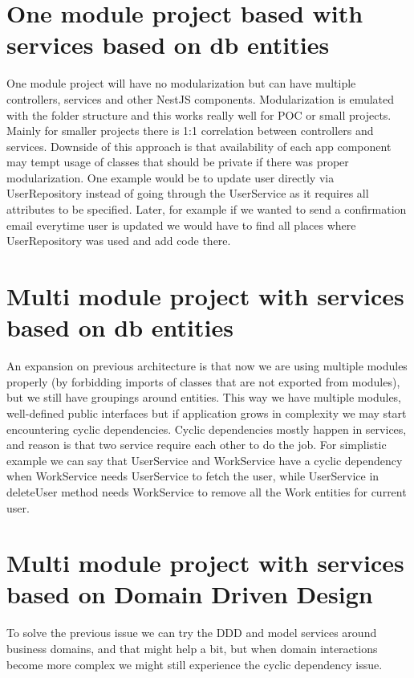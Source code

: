 \section{One module project based with services based on db entities}\label{sec:arch-om-db}

One module project will have no modularization but can have multiple controllers, services and other NestJS components.
Modularization is emulated with the folder structure and this works really well for POC or small projects.
Mainly for smaller projects there is 1:1 correlation between controllers and services.
Downside of this approach is that availability of each app component may tempt usage of classes that should be private
if there was proper modularization.
One example would be to update user directly via UserRepository instead of going through the UserService as it requires
all attributes to be specified.
Later, for example if we wanted to send a confirmation email everytime user is updated we would have to find all places
where UserRepository was used and add code there.

\section{Multi module project with services based on db entities}\label{sec:arch-mm-db}

An expansion on previous architecture is that now we are using multiple modules properly
(by forbidding imports of classes that are not exported from modules), but we still have groupings around entities.
This way we have multiple modules, well-defined public interfaces but if application grows in complexity we may start
encountering cyclic dependencies.
Cyclic dependencies mostly happen in services, and reason is that two service require each other to do the job.
For simplistic example we can say that UserService and WorkService have a cyclic dependency
when WorkService needs UserService to fetch the user, while UserService in deleteUser method needs WorkService
to remove all the Work entities for current user.

\section{Multi module project with services based on Domain Driven Design}\label{sec:arch-mm-ddd}

To solve the previous issue we can try the DDD and model services around business domains, and that might help a bit,
but when domain interactions become more complex we might still experience the cyclic dependency issue.

